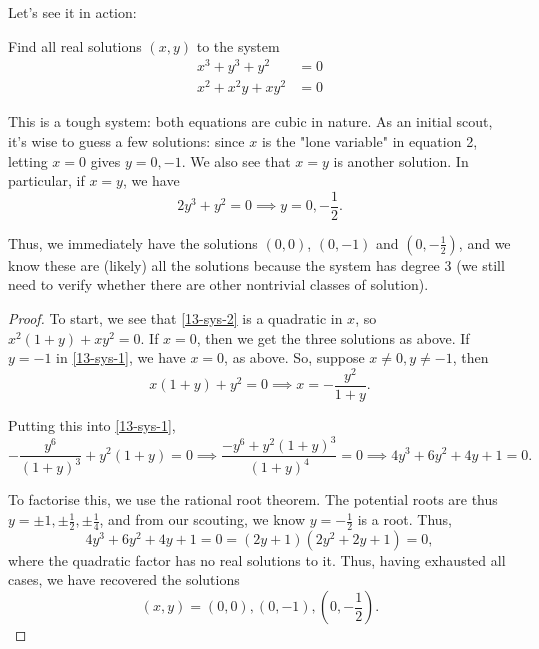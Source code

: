 \documentclass[../jarvis.tex]{subfiles}
\begin{document}
Let's see it in action:
\begin{example}[2021 SMO(S) P22]
Find all real solutions $(x,y)$ to the system
\begin{align}
    x^3+y^3+y^2&=0 \label{13-sys-1} \\
    x^2+x^2y+xy^2&=0 \label{13-sys-2}
\end{align}
\end{example}
This is a tough system: both equations are cubic in nature. As an initial scout, it's wise to guess a few solutions: since $x$ is the "lone variable" in equation 2, letting $x=0$ gives $y=0, -1$. We also see that $x=y$ is another solution. In particular, if $x=y$, we have $$2y^3+y^2=0 \implies y=0, -\frac{1}{2}.$$

Thus, we immediately have the solutions $(0,0)$, $(0,-1)$ and $(0, -\frac{1}{2})$, and we know these are (likely) all the solutions because the system has degree 3 (we still need to verify whether there are other nontrivial classes of solution).

\begin{proof}
    To start, we see that \eqref{13-sys-2} is a quadratic in $x$, so $x^2(1+y)+xy^2=0.$ If $x=0$, then we get the three solutions as above. If $y=-1$ in \eqref{13-sys-1}, we have $x=0$, as above. So, suppose $x\neq 0, y\neq -1$, then
$$x(1+y)+y^2=0 \implies x=-\frac{y^2}{1+y}.$$

Putting this into \eqref{13-sys-1}, 
$$-\frac{y^6}{(1+y)^3}+y^2(1+y)=0 \implies \frac{-y^6+y^2(1+y)^3}{(1+y)^4}=0 \implies 4y^3+6y^2+4y+1=0.$$

To factorise this, we use the rational root theorem. The potential roots are thus $y=\pm 1, \pm \frac{1}{2}, \pm\frac{1}{4}$, and from our scouting, we know $y=-\frac{1}{2}$ is a root. Thus,
$$4y^3+6y^2+4y+1=0=(2y+1)(2y^2+2y+1)=0,$$
where the quadratic factor has no real solutions to it. Thus, having exhausted all cases, we have recovered the solutions
$$\boxed{(x,y)=(0,0), (0,-1), (0,-\frac{1}{2})}.$$
\end{proof}
\end{document}

